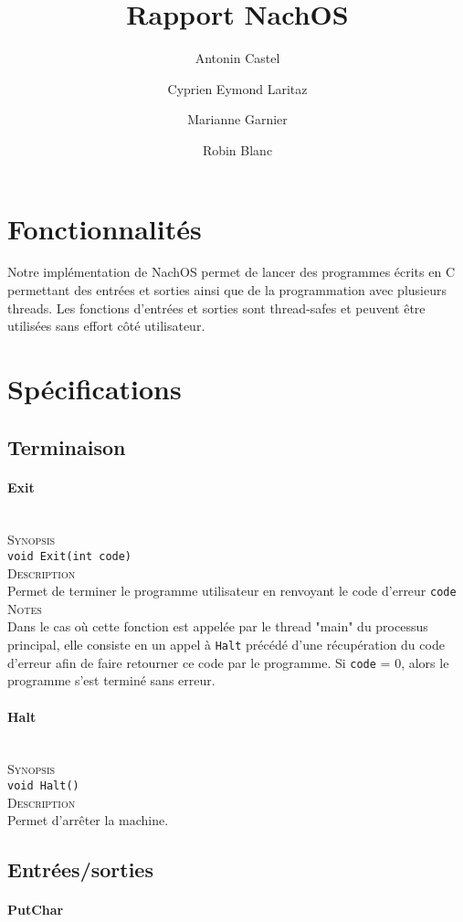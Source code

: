 \documentclass{report}
\title{Rapport NachOS}
\author{Antonin Castel \and
		Cyprien Eymond Laritaz \and
		Marianne Garnier \and
		Robin Blanc}
\newcommand{\myparagraph}[1]{\paragraph*{#1}\mbox{}\\}
\begin{document}
\maketitle

\section*{Fonctionnalités}
Notre implémentation de NachOS permet de lancer des programmes écrits en C permettant des entrées et sorties ainsi que de la programmation avec plusieurs threads. Les fonctions d'entrées et sorties sont thread-safes et peuvent être utilisées sans effort côté utilisateur.

\section*{Spécifications}
\subsection*{Terminaison}
\myparagraph{Exit}

\textsc{Synopsis}\\
	\texttt{void Exit(int code)}\\
	
\textsc{Description}\\
	Permet de terminer le programme utilisateur en renvoyant le code d'erreur \texttt{code}\\
	
\textsc{Notes}\\
	Dans le cas où cette fonction est appelée par le thread "main" du processus principal, elle consiste en un appel à \texttt{Halt} précédé d'une récupération du code d'erreur afin de faire retourner ce code par le programme. Si \texttt{code} = 0, alors le programme s'est terminé sans erreur.
		
\myparagraph{Halt}

\textsc{Synopsis}\\
	\texttt{void Halt()}\\
	
\textsc{Description}\\
	Permet d'arrêter la machine.\\

\subsection*{Entrées/sorties}
\myparagraph{PutChar}
\end{document}
